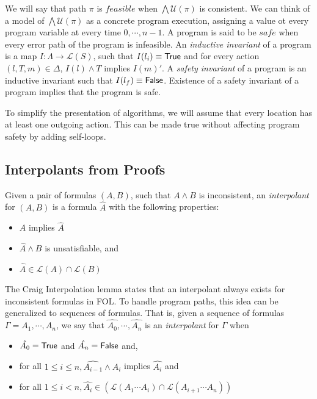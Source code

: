 We will say that path $\pi$ is $feasible$ when $\bigwedge \mathcal{U}(\pi)$ is consistent. We can think of a model of $\bigwedge \mathcal{U}(\pi)$ as a concrete program execution, assigning a value ot every program variable at every time $0, \cdots, n-1$. A program is said to be $safe$ when every error path of the program is infeasible. An \textit{inductive invariant} of a program is a map $I : \Lambda \rightarrow \mathcal{L}(S)$, such that $I(l_i) \equiv \mathsf{True}$ and for every action $(l, T, m) \in \Delta$, $I(l) \wedge T$ implies $I(m)'$. A \textit{safety invariant} of a program is an inductive invariant such that $I(l_f) \equiv \mathsf{False}$. Existence of a safety invariant of a program implies that the program is safe.

To simplify the presentation of algorithms, we will assume that every location has at least one outgoing action. This can be made true without affecting program safety by adding self-loops.

\subsection{Interpolants from Proofs}
\label{sec:interpolants-from-proofs}

Given a pair of formulas $(A,B)$, such that $A \wedge B$ is inconsistent, an \textit{interpolant} for $(A,B)$ is a formula $\hat{A}$ with the following properties:

\begin{itemize}
  \item $A$ implies $\hat{A}$
  \item $\hat{A} \wedge B$ is unsatisfiable, and
  \item $\hat{A} \in \mathcal{L}(A) \cap \mathcal{L}(B)$
\end{itemize}

The Craig Interpolation lemma \cite{craig1957} states that an interpolant always exists for inconsistent formulas in FOL. To handle program paths, this idea can be generalized to sequences of formulas. That is, given a sequence of formulas $\Gamma = A_1, \cdots , A_n$, we say that $\hat{A_0},\cdots, \hat{A_n}$ is an \textit{interpolant} for $\Gamma$ when

\begin{itemize}
  \item $\hat{A_0} = \mathsf{True}$ and $\hat{A_n} = \mathsf{False}$ and,
  \item for all $1 \leq i \leq n, \hat{A_{i-1}} \wedge A_i$ implies $\hat{A_i}$ and
  \item for all $1 \leq i < n, \hat{A_i} \in (\mathcal{L}(A_1 \cdots A_i) \cap \mathcal{L}(A_{i+1}\cdots A_n))$
\end{itemize}

